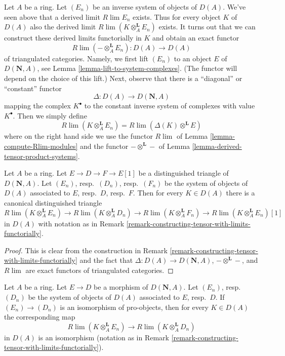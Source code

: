 \begin{remark}
\label{remark-constructing-tensor-with-limits-functorially}
Let $A$ be a ring. Let $(E_n)$ be an inverse system of objects
of $D(A)$. We've seen above that a derived limit $R\lim E_n$
exists. Thus for every object $K$ of $D(A)$ also the derived
limit $R\lim( K \otimes_A^\mathbf{L} E_n )$ exists.
It turns out that we can construct these derived limits
functorially in $K$ and obtain an exact functor
$$
R\lim(- \otimes_A^\mathbf{L} E_n) : D(A) \longrightarrow D(A)
$$
of triangulated categories. Namely, we first lift $(E_n)$ to an object $E$
of $D(\mathbf{N}, A)$, see Lemma \ref{lemma-lift-to-system-complexes}.
(The functor will depend on the choice of this lift.)
Next, observe that there is a ``diagonal'' or ``constant'' functor
$$
\Delta : D(A) \longrightarrow D(\mathbf{N}, A)
$$
mapping the complex $K^\bullet$ to the constant inverse system of
complexes with value $K^\bullet$. Then we simply define
$$
R\lim(K \otimes_A^\mathbf{L} E_n) = R\lim(\Delta(K)\otimes^\mathbf{L} E)
$$
where on the right hand side we use the functor $R\lim$ of
Lemma \ref{lemma-compute-Rlim-modules}
and the functor $- \otimes^\mathbf{L} -$ of
Lemma \ref{lemma-derived-tensor-product-systems}.
\end{remark}

\begin{lemma}
\label{lemma-tensor-Rlim-exact}
Let $A$ be a ring. Let $E \to D \to F \to E[1]$ be a distinguished
triangle of $D(\mathbf{N}, A)$. Let $(E_n)$, resp.\ $(D_n)$, resp.\ $(F_n)$
be the system of objects of $D(A)$ associated to $E$, resp.\ $D$, resp.\ $F$.
Then for every $K \in D(A)$ there is a canonical distinguished triangle
$$
R\lim (K \otimes^\mathbf{L}_A E_n) \to
R\lim (K \otimes^\mathbf{L}_A D_n) \to
R\lim (K \otimes^\mathbf{L}_A F_n) \to
R\lim (K \otimes^\mathbf{L}_A E_n)[1]
$$
in $D(A)$ with notation as in
Remark \ref{remark-constructing-tensor-with-limits-functorially}.
\end{lemma}

\begin{proof}
This is clear from the construction in
Remark \ref{remark-constructing-tensor-with-limits-functorially}
and the fact that $\Delta : D(A) \to D(\mathbf{N}, A)$,
$- \otimes^\mathbf{L} -$, and $R\lim$ are exact functors of triangulated
categories.
\end{proof}

\begin{lemma}
\label{lemma-tensor-Rlim-pro-equal}
Let $A$ be a ring. Let $E \to D$ be a morphism of
$D(\mathbf{N}, A)$. Let $(E_n)$, resp.\ $(D_n)$
be the system of objects of $D(A)$ associated to $E$, resp.\ $D$.
If $(E_n) \to (D_n)$ is an isomorphism of pro-objects, then for every
$K \in D(A)$ the corresponding map
$$
R\lim (K \otimes^\mathbf{L}_A E_n)
\longrightarrow
R\lim (K \otimes^\mathbf{L}_A D_n)
$$
in $D(A)$ is an isomorphism
(notation as in
Remark \ref{remark-constructing-tensor-with-limits-functorially}).
\end{lemma}

